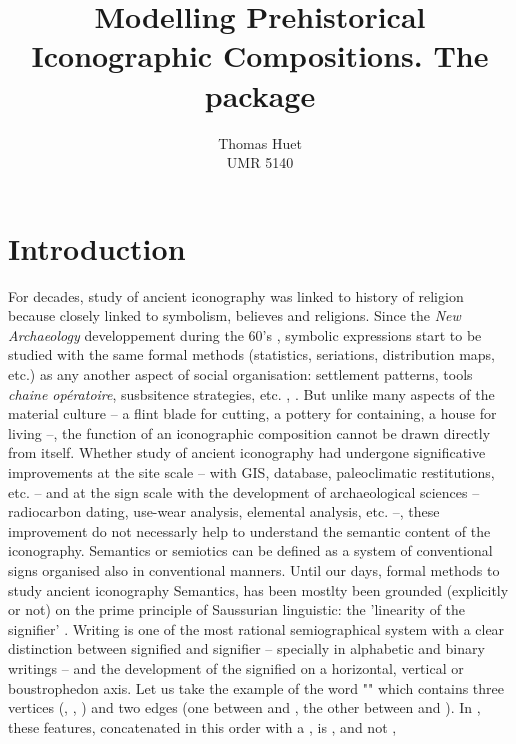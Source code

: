 \documentclass[article]{jss}\usepackage[]{graphicx}\usepackage[]{color}
\author{Thomas Huet\\UMR 5140}
\title{Modelling Prehistorical Iconographic Compositions. The \proglang{R} package \pkg{decorr}}
\begin{document}

\section[Introduction]{Introduction} \label{sec:intro}

For decades, study of ancient iconography was linked to history of religion because closely linked to symbolism, believes and religions. Since the \textit{New Archaeology} developpement during the 60's \citep{Clarke14}, symbolic expressions start to be studied with the same formal methods (statistics, seriations, distribution maps, etc.) as any another aspect of social organisation: settlement patterns, tools \emph{chaine opératoire}, susbsitence strategies, etc. \citep{Renfrew91}, \citep{LeroiGourhan92}. But unlike many aspects of the material culture -- a flint blade for cutting, a pottery for containing, a house for living --, the function of an iconographic composition cannot be drawn directly from itself. Whether study of ancient iconography had  undergone significative improvements at the site scale -- with GIS, database, paleoclimatic restitutions, etc. -- and at the sign scale with the development of archaeological sciences -- radiocarbon dating, use-wear analysis, elemental analysis, etc. --, these improvement do not necessarly help to understand the semantic content of the iconography.
Semantics or semiotics can be defined as a system of conventional signs organised also in conventional manners.  
Until our days, formal methods to study ancient iconography Semantics, has been mostlty been grounded (explicitly or not) on the prime principle of Saussurian linguistic: the 'linearity of the signifier' \citep{Saussure89}. Writing is one of the most rational semiographical system with a clear distinction between signified and signifier -- specially in alphabetic and binary writings -- and the development of the signified on a horizontal, vertical or boustrophedon axis. 
Let us take the example of the word "" which contains three vertices (, , ) and two edges (one between  and , the other between  and ). In , these features, concatenated in this order with a , is , and not , 
\end{document}
